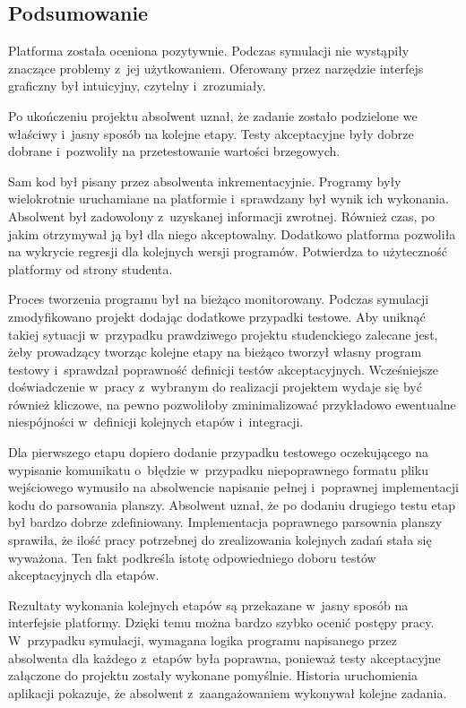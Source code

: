 \subsection{Podsumowanie}

Platforma została oceniona pozytywnie.
Podczas symulacji nie wystąpiły znaczące problemy z~jej użytkowaniem.
Oferowany przez narzędzie interfejs graficzny był intuicyjny, czytelny i~zrozumiały.

Po ukończeniu projektu absolwent uznał, że zadanie zostało podzielone we właściwy i~jasny sposób na kolejne etapy.
Testy akceptacyjne były dobrze dobrane i~pozwoliły na przetestowanie wartości brzegowych.

Sam kod był pisany przez absolwenta inkrementacyjnie.
Programy były wielokrotnie uruchamiane na platformie i~sprawdzany był wynik ich wykonania.
Absolwent był zadowolony z~uzyskanej informacji zwrotnej.
Również czas, po jakim otrzymywał ją był dla niego akceptowalny.
Dodatkowo platforma pozwoliła na wykrycie regresji dla kolejnych wersji programów.
Potwierdza to użyteczność platformy od strony studenta.

Proces tworzenia programu był na bieżąco monitorowany.
Podczas symulacji zmodyfikowano projekt dodając dodatkowe przypadki testowe.
Aby uniknąć takiej sytuacji w~przypadku prawdziwego projektu studenckiego zalecane jest, żeby prowadzący tworząc kolejne etapy na bieżąco tworzył własny program testowy i~sprawdzał poprawność definicji testów akceptacyjnych.
Wcześniejsze doświadczenie w~pracy z~wybranym do realizacji projektem wydaje się być również kliczowe, na pewno pozwoliłoby zminimalizować przykładowo ewentualne niespójności w~definicji kolejnych etapów i~integracji.

Dla pierwszego etapu dopiero dodanie przypadku testowego oczekującego na wypisanie komunikatu o~błędzie w~przypadku niepoprawnego formatu pliku wejściowego wymusiło na absolwencie napisanie pełnej i~poprawnej implementacji kodu do parsowania planszy.
Absolwent uznał, że po dodaniu drugiego testu etap był bardzo dobrze zdefiniowany.
Implementacja poprawnego parsownia planszy sprawiła, że ilość pracy potrzebnej do zrealizowania kolejnych zadań stała się wyważona.
Ten fakt podkreśla istotę odpowiedniego doboru testów akceptacyjnych dla etapów.

Rezultaty wykonania kolejnych etapów są przekazane w~jasny sposób na interfejsie platformy.
Dzięki temu można bardzo szybko ocenić postępy pracy.
W~przypadku symulacji, wymagana logika programu napisanego przez absolwenta dla każdego z~etapów była poprawna, ponieważ testy akceptacyjne załączone do projektu zostały wykonane pomyślnie.
Historia uruchomienia aplikacji pokazuje, że absolwent z~zaangażowaniem wykonywał kolejne zadania.

